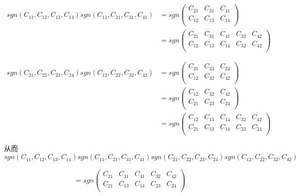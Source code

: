 \documentclass{amsc}          %
\numberwithin{equation}{section} %
\begin{document}
\begin{prof}
\begin{equation*}
\begin{aligned}
sgn(C_{11},C_{12},C_{13},C_{14})sgn(C_{11},C_{21},C_{31},C_{41})
&=sgn\left(
\begin{array}{ccc}
C_{21}&C_{31}&C_{41}\\
C_{12}&C_{13}&C_{14}\\
\end{array}\right)\\
&=sgn\left(
\begin{array}{ccccc}
C_{21}&C_{31}&C_{41}&C_{32}&C_{42}\\
C_{12}&C_{13}&C_{14}&C_{32}&C_{42}\\
\end{array}\right)
\end{aligned}
\end{equation*}

\begin{equation*}
\begin{aligned}
sgn(C_{21},C_{22},C_{23},C_{24})sgn(C_{12},C_{22},C_{32},C_{42})
&=sgn\left(
\begin{array}{ccc}
C_{21}&C_{23}&C_{24}\\
C_{12}&C_{32}&C_{42}\\
\end{array}\right)\\
&=sgn\left(
\begin{array}{ccc}
C_{12}&C_{32}&C_{42}\\
C_{21}&C_{23}&C_{24}\\
\end{array}\right)\\
&=sgn\left(
\begin{array}{ccccc}
C_{12}&C_{13}&C_{14}&C_{32}&C_{42}\\
C_{21}&C_{13}&C_{14}&C_{23}&C_{24}\\
\end{array}\right)
\end{aligned}
\end{equation*}

从而
$$sgn(C_{11},C_{12},C_{13},C_{14})sgn(C_{11},C_{21},C_{31},C_{41})sgn(C_{21},C_{22},C_{23},C_{24})sgn(C_{12},C_{22},C_{32},C_{42})$$

\begin{equation*}
\begin{aligned}
=sgn\left(
\begin{array}{ccccc}
C_{21}&C_{31}&C_{41}&C_{32}&C_{42}\\
C_{21}&C_{13}&C_{14}&C_{23}&C_{24}\\
\end{array}\right)\\
\end{aligned}
\end{equation*}


\end{prof}
\end{document}
